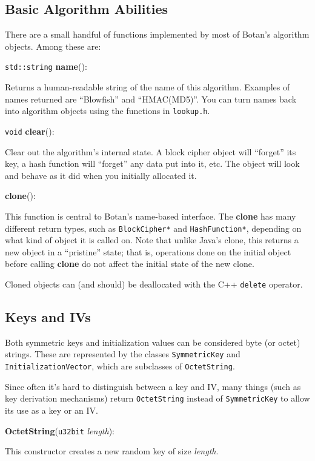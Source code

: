 \documentclass{article}
\newcommand{\filename}[1]{\texttt{#1}}
\newcommand{\function}[1]{\textbf{#1}}
\newcommand{\type}[1]{\texttt{#1}}
\renewcommand{\arg}[1]{\textsl{#1}}
\begin{document}
\subsection{Basic Algorithm Abilities}

There are a small handful of functions implemented by most of Botan's
algorithm objects. Among these are:

\noindent
\type{std::string} \function{name}():

Returns a human-readable string of the name of this algorithm. Examples of
names returned are ``Blowfish'' and ``HMAC(MD5)''. You can turn names back into
algorithm objects using the functions in \filename{lookup.h}.

\noindent
\type{void} \function{clear}():

Clear out the algorithm's internal state. A block cipher object will
``forget'' its key, a hash function will ``forget'' any data put into
it, etc. The object will look and behave as it did when you initially
allocated it.

\noindent
\function{clone}():

This function is central to Botan's name-based interface. The \function{clone}
has many different return types, such as \type{BlockCipher*} and
\type{HashFunction*}, depending on what kind of object it is called on. Note
that unlike Java's clone, this returns a new object in a ``pristine'' state;
that is, operations done on the initial object before calling \function{clone}
do not affect the initial state of the new clone.

Cloned objects can (and should) be deallocated with the C++ \texttt{delete}
operator.

\subsection{Keys and IVs}

Both symmetric keys and initialization values can be considered byte
(or octet) strings. These are represented by the classes
\type{SymmetricKey} and \type{InitializationVector}, which are
subclasses of \type{OctetString}.

Since often it's hard to distinguish between a key and IV, many things (such as
key derivation mechanisms) return \type{OctetString} instead of
\type{SymmetricKey} to allow its use as a key or an IV.

\noindent
\function{OctetString}(\type{u32bit} \arg{length}):

This constructor creates a new random key of size \arg{length}.
\end{document}
